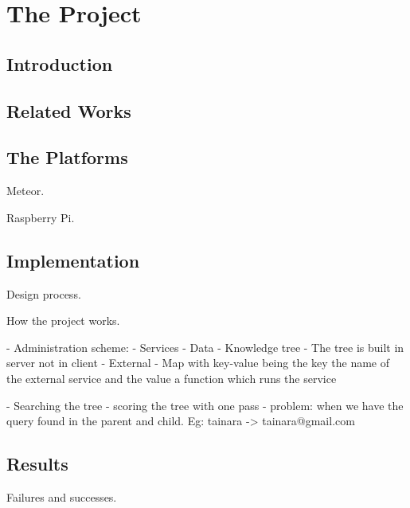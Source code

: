 \chapter{The Project}
\label{sec:project}



\section{Introduction}


\section{Related Works}


\section{The Platforms}

Meteor.

Raspberry Pi.

\section{Implementation}

Design process.

How the project works.

- Administration scheme:
    - Services
        - Data
            - Knowledge tree
                - The tree is built in server not in client
        - External
            - Map with key-value being the key the name of the external service and the value a function which runs the service

- Searching the tree
    - scoring the tree with one pass
    - problem: when we have the query found in the parent and child. Eg: tainara -> tainara@gmail.com

\section{Results}

Failures and successes.
